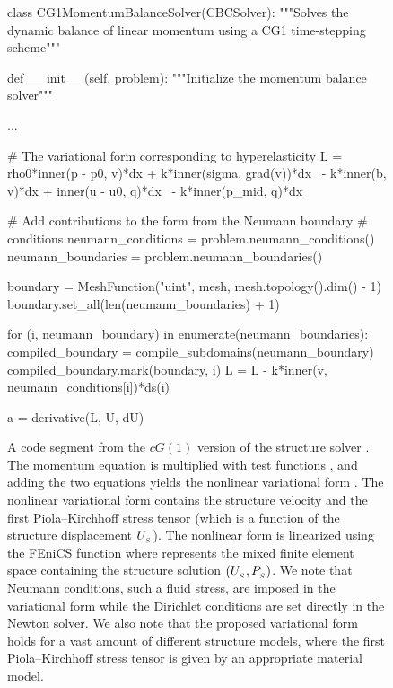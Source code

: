 \begin{figure}
\label{selim:fig:structuresolver}
\caption{A code segment from the $cG(1)$ version of the structure
  solver .  The momentum equation is multiplied with
  test functions ,  and adding the two equations
  yields the nonlinear variational form . The nonlinear
  variational form  contains the structure velocity
   and the first Piola--Kirchhoff stress tensor
   (which is a function of the structure
  displacement $U_{_{S}}$).  The nonlinear form  is
  linearized using the FEniCS function  where
   represents the mixed finite element space containing the
  structure solution $(U_{_{S}}, P_{_{S}})$.  We note that Neumann
  conditions, such a fluid stress, are imposed in the variational form
   while the Dirichlet conditions are set directly in the
  Newton solver. We also note that the proposed variational form holds
  for a vast amount of different structure models, where the first
  Piola--Kirchhoff stress tensor  is given by an
  appropriate material model.  }
\begin{python}
class CG1MomentumBalanceSolver(CBCSolver):
    """Solves the dynamic balance of linear momentum using a CG1
    time-stepping scheme"""

    def __init__(self, problem):
        """Initialize the momentum balance solver"""

        ...

        # The variational form corresponding to hyperelasticity
        L = rho0*inner(p - p0, v)*dx + k*inner(sigma, grad(v))*dx \
          - k*inner(b, v)*dx + inner(u - u0, q)*dx \
          - k*inner(p_mid, q)*dx

        # Add contributions to the form from the Neumann boundary
        # conditions
        neumann_conditions = problem.neumann_conditions()
        neumann_boundaries = problem.neumann_boundaries()

        boundary = MeshFunction("uint", mesh, mesh.topology().dim() - 1)
        boundary.set_all(len(neumann_boundaries) + 1)

        for (i, neumann_boundary) in enumerate(neumann_boundaries):
            compiled_boundary = compile_subdomains(neumann_boundary)
            compiled_boundary.mark(boundary, i)
            L = L - k*inner(v, neumann_conditions[i])*ds(i)

        a = derivative(L, U, dU)
\end{python}
\end{figure}

